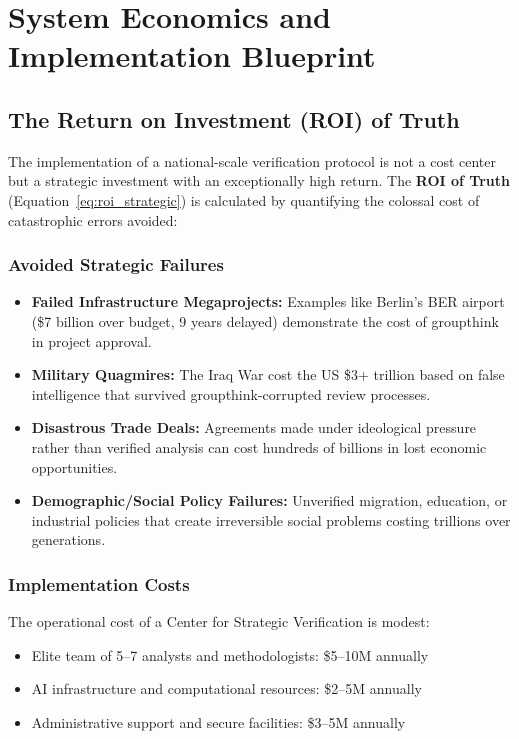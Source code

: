 \documentclass[11pt,a4paper]{article}
\begin{document}
\section{System Economics and Implementation Blueprint}
\subsection{The Return on Investment (ROI) of Truth}
The implementation of a national-scale verification protocol is not a cost center but a strategic investment with an exceptionally high return. The \textbf{ROI of Truth} (Equation~\eqref{eq:roi_strategic}) is calculated by quantifying the colossal cost of catastrophic errors avoided:

\subsubsection{Avoided Strategic Failures}
\begin{itemize}[nosep]
    \item \textbf{Failed Infrastructure Megaprojects:} Examples like Berlin's BER airport (\$7 billion over budget, 9 years delayed) demonstrate the cost of groupthink in project approval.
    
    \item \textbf{Military Quagmires:} The Iraq War cost the US \$3+ trillion based on false intelligence that survived groupthink-corrupted review processes.
    
    \item \textbf{Disastrous Trade Deals:} Agreements made under ideological pressure rather than verified analysis can cost hundreds of billions in lost economic opportunities.
    
    \item \textbf{Demographic/Social Policy Failures:} Unverified migration, education, or industrial policies that create irreversible social problems costing trillions over generations.
\end{itemize}

\subsubsection{Implementation Costs}
The operational cost of a Center for Strategic Verification is modest:
\begin{itemize}[nosep]
    \item Elite team of 5--7 analysts and methodologists: \$5--10M annually
    \item AI infrastructure and computational resources: \$2--5M annually
    \item Administrative support and secure facilities: \$3--5M annually
\end{itemize}
\end{document}
